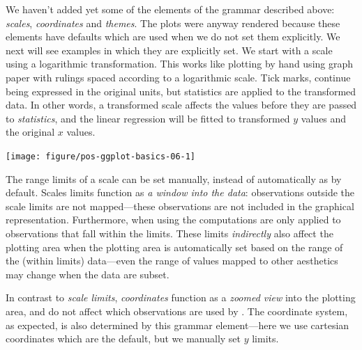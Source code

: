 \documentclass[krantz2]{krantz}\usepackage{knitr}%
\begin{document}
We haven't added yet some of the elements of the grammar described above: \emph{scales}, \emph{coordinates} and \emph{themes}. The plots were anyway rendered because these elements have defaults which are used when we do not set them explicitly. We next will see examples in which they are explicitly set. We start with a scale using a logarithmic transformation. This works like plotting by hand using graph paper with rulings spaced according to a logarithmic scale. Tick marks, continue being expressed in the original units, but statistics are applied to the transformed data. In other words, a transformed scale affects the values before they are passed to \emph{statistics}, and the linear regression will be fitted to  transformed $y$ values and the original $x$ values.

\begin{knitrout}\footnotesize
{}\color{fgcolor}\begin{kframe}
\begin{alltt}
\hlstd{(} 
       \hlstd{(}    \hlopt{+}
  \hlstd{()} \hlopt{+}
  \hlstd{(} \hlstd{=} \hlstd{,}  \hlstd{=} \hlstd{)} \hlopt{+}
  \hlstd{()}
\end{alltt}
\end{kframe}

{\centering \texttt{[image: figure/pos-ggplot-basics-06-1]} 

}



\end{knitrout}

The range limits of a scale can be set manually, instead of automatically as by default. Scales limits function as \emph{a window into the data}: observations outside the scale limits are not mapped---these observations are not included in the graphical representation. Furthermore, when using  the computations are only applied to observations that fall within the limits. These limits \emph{indirectly} also affect the plotting area when the plotting area is automatically set based on the range of the (within limits) data---even the range of values mapped to other aesthetics may change when the data are subset.

In contrast to \emph{scale limits}, \emph{coordinates} function as a \emph{zoomed view} into the plotting area, and do not affect which observations are used by . The coordinate system, as expected, is also determined by this grammar element---here we use cartesian coordinates which are the default, but we manually set $y$ limits.
\end{document}
